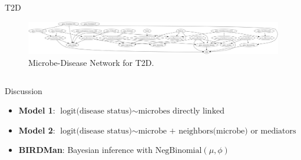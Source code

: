 \documentclass[final]{beamer}
\begin{document}
\begin{frame}[t]
\begin{columns}[t]
\begin{column}{0.65\textwidth}
  \begin{block}{T2D}


    \begin{figure}
      \centering
      \includegraphics[width=\linewidth]{../graphs/t2d/cdnod_norm.png}
      \caption{Microbe-Disease Network for T2D.}
    \end{figure}
  


    
  \end{block}

  \begin{columns}[t]
    \begin{column}{0.5\linewidth}
      \begin{block}{Discussion}
      \begin{itemize}
        \item \textbf{Model 1}: \( \text{logit(disease status)} \sim \text{microbes directly linked} \)
        \item \textbf{Model 2}: \( \text{logit(disease status)} \sim \text{microbe + neighbors(microbe) or mediators} \)
        \item \textbf{BIRDMan}: Bayesian inference with \( \text{NegBinomial}(\mu, \phi) \)
      \end{itemize}


\end{block}
\end{column}
\end{columns}
\end{column}
\end{columns}
\end{frame}
\end{document}
